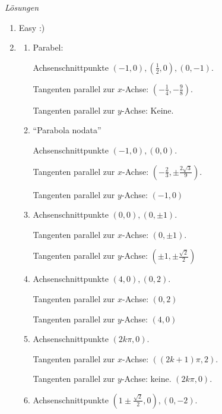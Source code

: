 \clearpage
\emph{Lösungen}
\begin{enumerate}
    \item Easy :)
    \item
          \begin{enumerate}
              \item Parabel:

                    Achsenschnittpunkte \( \left(-1, 0\right), \left(\frac{1}{2}, 0\right), \left(0, -1\right)\).

                    Tangenten parallel zur \(x\)-Achse: \( \left(-\frac{1}{4}, -\frac{9}{8}\right)\).

                    Tangenten parallel zur \(y\)-Achse: Keine.

              \item ``Parabola nodata''

                    Achsenschnittpunkte \( \left(-1, 0\right), \left(0, 0\right)\).

                    Tangenten parallel zur \(x\)-Achse: \( \left(-\frac{2}{3}, \pm\frac{2\sqrt{3}}{9}\right)\).

                    Tangenten parallel zur \(y\)-Achse: \(\left(-1, 0\right)\)


              \item Achsenschnittpunkte \( \left(0, 0\right), \left(0, \pm 1\right)\).

                    Tangenten parallel zur \(x\)-Achse: \( \left(0, \pm 1\right)\).

                    Tangenten parallel zur \(y\)-Achse: \(\left(\pm1, \pm\frac{\sqrt{2}}{2}\right)\)

              \item Achsenschnittpunkte \( \left(4, 0\right), \left(0, 2\right)\).

                    Tangenten parallel zur \(x\)-Achse:  \(\left(0, 2\right)\)

                    Tangenten parallel zur \(y\)-Achse: \( \left(4, 0\right)\)

              \item Achsenschnittpunkte \( \left(2k\pi, 0\right)\).

                    Tangenten parallel zur \(x\)-Achse:  \( \left((2k+1)\pi, 2\right)\).

                    Tangenten parallel zur \(y\)-Achse: keine. \( \left(2k\pi, 0\right) \).

              \item Achsenschnittpunkte \( \left(1\pm\frac{\sqrt{2}}{2}, 0\right), \left(0, -2\right)\).


\end{enumerate}
\end{enumerate}
